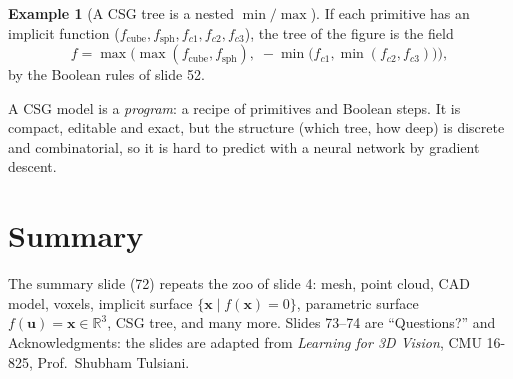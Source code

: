 \documentclass[11pt,a4paper]{article}
\newcommand{\R}{\mathbb{R}}
\newcommand{\vx}{\bm{x}}
\newcommand{\vu}{\bm{u}}
\theoremstyle{definition}
\newtheorem{example}[definition]{Example}
\theoremstyle{plain}
\theoremstyle{remark}
\begin{document}
\begin{example}[A CSG tree is a nested $\min/\max$]
If each primitive has an implicit function ($f_{\text{cube}},f_{\text{sph}},f_{c1},f_{c2},f_{c3}$), the tree of the figure is the field
\[
f=\max\Big(\max(f_{\text{cube}},f_{\text{sph}}),\;-\min\big(f_{c1},\min(f_{c2},f_{c3})\big)\Big),
\]
by the Boolean rules of slide 52.
\end{example}

\begin{intuition}
A CSG model is a \emph{program}: a recipe of primitives and Boolean steps. It is compact, editable and exact, but the structure (which tree, how deep) is discrete and combinatorial, so it is hard to predict with a neural network by gradient descent.
\end{intuition}

\section{Summary }\label{sec:summary}

The summary slide (72) repeats the zoo of slide 4: mesh, point cloud, CAD model, voxels, implicit surface $\{\vx\mid f(\vx)=0\}$, parametric surface $f(\vu)=\vx\in\R^3$, CSG tree, and many more. Slides 73--74 are ``Questions?'' and Acknowledgments: the slides are adapted from \emph{Learning for 3D Vision}, CMU 16-825, Prof.\ Shubham Tulsiani.
\end{document}
